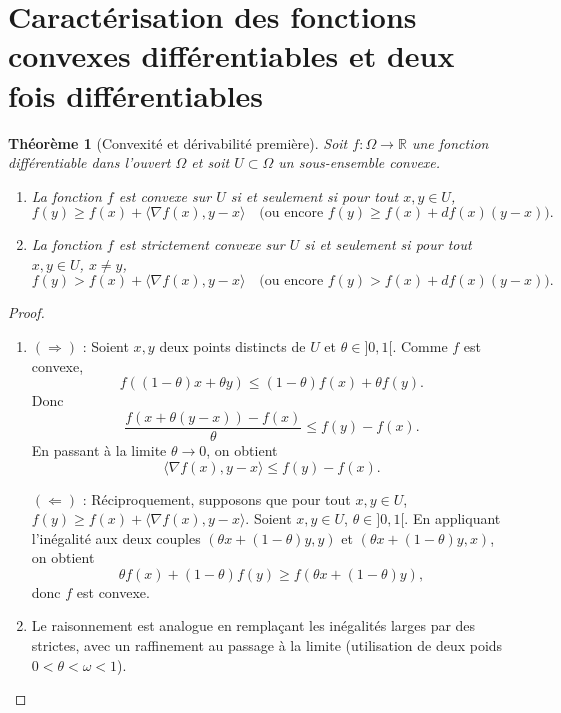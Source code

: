 \documentclass[a4paper,12pt,openany]{book}
\theoremstyle{plain}
\newtheorem{theorem}{Théorème}[section]
\theoremstyle{definition}
\theoremstyle{remark}
\theoremstyle{nbstyle}
\newcommand{\R}{\mathbb{R}}
\begin{document}
	\section{Caractérisation des fonctions convexes différentiables et deux fois différentiables}
	
	\begin{theorem}[Convexité et dérivabilité première]\label{thm:conv_deriv1}
		Soit $f : \Omega \to \R$ une fonction différentiable dans l’ouvert $\Omega$ et soit $U \subset \Omega$ un sous-ensemble convexe.  
		\begin{enumerate}%
			\item La fonction $f$ est convexe sur $U$ si et seulement si pour tout $x,y \in U$,
			\[
			f(y) \geq f(x) + \langle \nabla f(x), y - x \rangle
			\quad \text{(ou encore $f(y) \geq f(x) + df(x)(y-x)$).}
			\]
			\item La fonction $f$ est strictement convexe sur $U$ si et seulement si pour tout $x,y \in U$, $x \neq y$,
			\[
			f(y) > f(x) + \langle \nabla f(x), y - x \rangle
			\quad \text{(ou encore $f(y) > f(x) + df(x)(y-x)$).}
			\]
		\end{enumerate}
	\end{theorem}
	
	\begin{proof}%
		\begin{enumerate}%
			\item $(\Rightarrow)$ : Soient $x,y$ deux points distincts de $U$ et $\theta \in ]0,1[$. Comme $f$ est convexe,
			\[
			f((1-\theta)x + \theta y) \leq (1-\theta)f(x) + \theta f(y).
			\]
			Donc
			\[
			\frac{f(x+\theta(y-x)) - f(x)}{\theta} \leq f(y) - f(x).
			\]
			En passant à la limite $\theta \to 0$, on obtient
			\[
			\langle \nabla f(x), y-x \rangle \leq f(y) - f(x).
			\]
			
			$(\Leftarrow)$ : Réciproquement, supposons que pour tout $x,y \in U$,  
			$f(y) \geq f(x) + \langle \nabla f(x), y-x \rangle$.  
			Soient $x,y \in U$, $\theta \in ]0,1[$. En appliquant l’inégalité aux deux couples 
			$(\theta x + (1-\theta)y,y)$ et $(\theta x + (1-\theta)y,x)$, on obtient
			\[
			\theta f(x) + (1-\theta)f(y) \geq f(\theta x + (1-\theta)y),
			\]
			donc $f$ est convexe.
			
			\item Le raisonnement est analogue en remplaçant les inégalités larges par des strictes, avec un raffinement au passage à la limite (utilisation de deux poids $0 < \theta < \omega < 1$).
		\end{enumerate}
	\end{proof}
	
\end{document}
